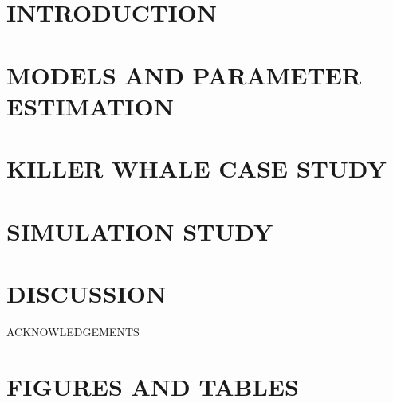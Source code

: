\documentclass{TD-CJS}
\begin{document}
%
\section{INTRODUCTION}

%
\section{MODELS AND PARAMETER ESTIMATION}
\label{sec:models}

%
\section{KILLER WHALE CASE STUDY}
\label{sec:data}

%
\section{SIMULATION STUDY}
\label{sec:sim_study}

%
\section{DISCUSSION}

%
\begin{ack}{ACKNOWLEDGEMENTS}
\end{ack}
%
\newpage

%
\newpage
\begin{appendix}
%

\end{appendix}
%
\newpage
\section{FIGURES AND TABLES}

%
\end{document}
